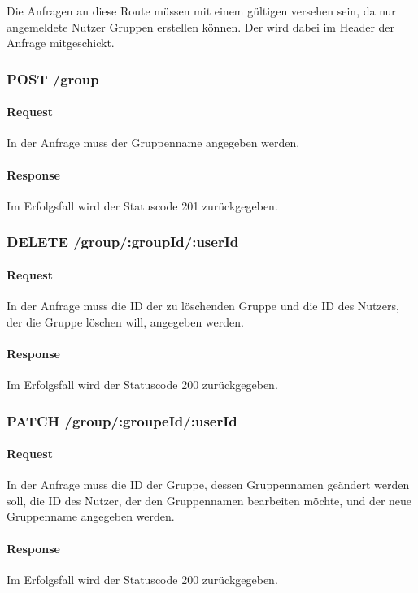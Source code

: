 \documentclass{entwurfsheft}
\begin{document}
Die Anfragen an diese Route müssen mit einem gültigen  versehen sein, da nur angemeldete Nutzer Gruppen erstellen können.
Der  wird dabei im Header der Anfrage mitgeschickt.

\subsubsection*{POST /group}
    \paragraph{Request}
        In der Anfrage muss der Gruppenname angegeben werden.
    \paragraph{Response}
        Im Erfolgsfall wird der Statuscode 201 zurückgegeben.
    
\subsubsection*{DELETE /group/:groupId/:userId}
    \paragraph{Request}
        In der Anfrage muss die ID der zu löschenden Gruppe und die ID des Nutzers, der die Gruppe löschen will, angegeben werden.
    \paragraph{Response}
        Im Erfolgsfall wird der Statuscode 200 zurückgegeben.
        
\subsubsection*{PATCH /group/:groupeId/:userId}
    \paragraph{Request}
        In der Anfrage muss die ID der Gruppe, dessen Gruppennamen geändert werden soll, die ID des Nutzer, der den Gruppennamen bearbeiten möchte, und der neue Gruppenname angegeben werden.
    \paragraph{Response}
        Im Erfolgsfall wird der Statuscode 200 zurückgegeben.
        
\end{document}
